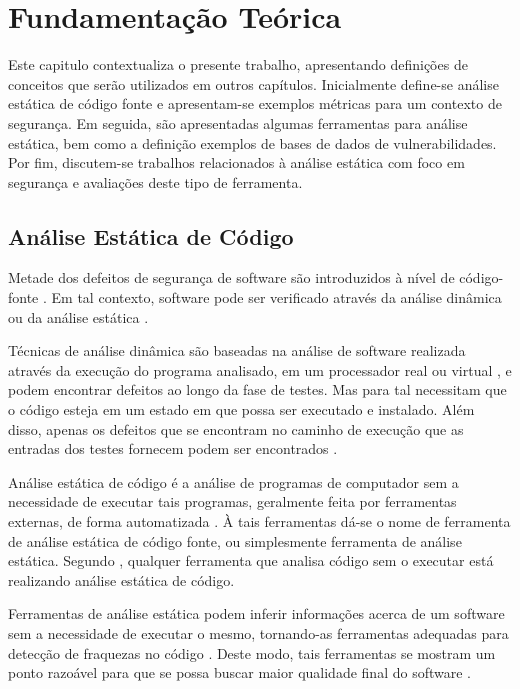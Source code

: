 \chapter{Fundamentação Teórica}\label{fundamentacao_teorica}

Este capitulo contextualiza o presente trabalho, apresentando definições de conceitos que serão utilizados em outros capítulos. Inicialmente define-se análise estática de código fonte e apresentam-se exemplos métricas para um contexto de segurança. Em seguida, são apresentadas algumas ferramentas para análise estática, bem como a definição exemplos de bases de dados de vulnerabilidades. Por fim, discutem-se trabalhos relacionados à análise estática com foco em segurança e avaliações deste tipo de ferramenta.

\section{Análise Estática de Código}\label{fundamentacao_teorica:analise_estatica_de_codigo}

Metade dos defeitos de segurança de software são introduzidos à nível de código-fonte \cite{vadim}. Em tal contexto, software pode ser verificado através da análise dinâmica ou da análise estática \cite{concolic}.

Técnicas de análise dinâmica são baseadas na análise de software realizada através da execução do programa analisado, em um processador real ou virtual \cite{concolic}, e podem encontrar defeitos ao longo da fase de testes. Mas para tal necessitam que o código esteja em um estado em que possa ser executado e instalado. Além disso, apenas os defeitos que se encontram no caminho de execução que as entradas dos testes fornecem podem ser encontrados \cite{harvard}.

Análise estática de código é a análise de programas de computador sem a necessidade de executar tais programas, geralmente feita por ferramentas externas, de forma automatizada \cite{kannavara}. À tais ferramentas dá-se o nome de ferramenta de análise estática de código fonte, ou simplesmente ferramenta de análise estática. Segundo \cite{secure_programming}, qualquer ferramenta que analisa código sem o executar está realizando análise estática de código.

Ferramentas de análise estática podem inferir informações  acerca de um software sem a necessidade de executar o mesmo, tornando-as ferramentas adequadas para detecção de fraquezas no código \cite{vadim}. Deste modo, tais ferramentas se mostram um ponto razoável para que se possa buscar maior qualidade final do software \cite{sa_spec}.

